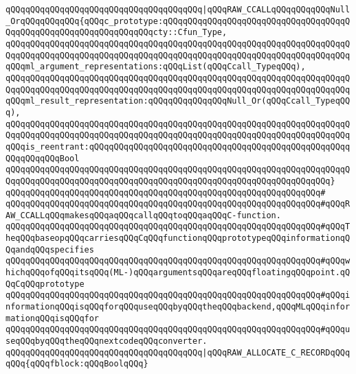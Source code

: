 \newline
\verb|qQQqqQQqqQQqqQQqqQQqqQQqqQQqqQQqqQQqqQQq|\verb#|qQQqRAW_CCALLqQQqqQQqqQQqNull_OrqQQqqQQqqQQq{qQQqc_prototype:qQQqqQQqqQQqqQQqqQQqqQQqqQQqqQQqqQQqqQQqqQQqqQQqqQQqqQQqqQQqqQQqqQQqcty::Cfun_Type,#\newline
\verb|qQQqqQQqqQQqqQQqqQQqqQQqqQQqqQQqqQQqqQQqqQQqqQQqqQQqqQQqqQQqqQQqqQQqqQQqqQQqqQQqqQQqqQQqqQQqqQQqqQQqqQQqqQQqqQQqqQQqqQQqqQQqqQQqqQQqqQQqqQQqqQQqml_argument_representations:qQQqList(qQQqCcall_TypeqQQq),|\newline
\verb|qQQqqQQqqQQqqQQqqQQqqQQqqQQqqQQqqQQqqQQqqQQqqQQqqQQqqQQqqQQqqQQqqQQqqQQqqQQqqQQqqQQqqQQqqQQqqQQqqQQqqQQqqQQqqQQqqQQqqQQqqQQqqQQqqQQqqQQqqQQqqQQqml_result_representation:qQQqqQQqqQQqqQQqNull_Or(qQQqCcall_TypeqQQq),|\newline
\verb|qQQqqQQqqQQqqQQqqQQqqQQqqQQqqQQqqQQqqQQqqQQqqQQqqQQqqQQqqQQqqQQqqQQqqQQqqQQqqQQqqQQqqQQqqQQqqQQqqQQqqQQqqQQqqQQqqQQqqQQqqQQqqQQqqQQqqQQqqQQqqQQqis_reentrant:qQQqqQQqqQQqqQQqqQQqqQQqqQQqqQQqqQQqqQQqqQQqqQQqqQQqqQQqqQQqqQQqBool|\newline
\verb|qQQqqQQqqQQqqQQqqQQqqQQqqQQqqQQqqQQqqQQqqQQqqQQqqQQqqQQqqQQqqQQqqQQqqQQqqQQqqQQqqQQqqQQqqQQqqQQqqQQqqQQqqQQqqQQqqQQqqQQqqQQqqQQqqQQqqQQq}|\newline
\verb|qQQqqQQqqQQqqQQqqQQqqQQqqQQqqQQqqQQqqQQqqQQqqQQqqQQqqQQqqQQqqQQq#|\newline
\verb|qQQqqQQqqQQqqQQqqQQqqQQqqQQqqQQqqQQqqQQqqQQqqQQqqQQqqQQqqQQqqQQq#qQQqRAW_CCALLqQQqmakesqQQqaqQQqcallqQQqtoqQQqaqQQqC-function.|\newline
\verb|qQQqqQQqqQQqqQQqqQQqqQQqqQQqqQQqqQQqqQQqqQQqqQQqqQQqqQQqqQQqqQQq#qQQqTheqQQqbaseopqQQqcarriesqQQqCqQQqfunctionqQQqprototypeqQQqinformationqQQqandqQQqspecifies|\newline
\verb|qQQqqQQqqQQqqQQqqQQqqQQqqQQqqQQqqQQqqQQqqQQqqQQqqQQqqQQqqQQqqQQq#qQQqwhichqQQqofqQQqitsqQQq(ML-)qQQqargumentsqQQqareqQQqfloatingqQQqpoint.qQQqCqQQqprototype|\newline
\verb|qQQqqQQqqQQqqQQqqQQqqQQqqQQqqQQqqQQqqQQqqQQqqQQqqQQqqQQqqQQqqQQq#qQQqinformationqQQqisqQQqforqQQquseqQQqbyqQQqtheqQQqbackend,qQQqMLqQQqinformationqQQqisqQQqfor|\newline
\verb|qQQqqQQqqQQqqQQqqQQqqQQqqQQqqQQqqQQqqQQqqQQqqQQqqQQqqQQqqQQqqQQq#qQQquseqQQqbyqQQqtheqQQqnextcodeqQQqconverter.|\newline
\newline
\newline
\newline
\verb|qQQqqQQqqQQqqQQqqQQqqQQqqQQqqQQqqQQqqQQq|\verb#|qQQqRAW_ALLOCATE_C_RECORDqQQqqQQq{qQQqfblock:qQQqBoolqQQq}#\newline
